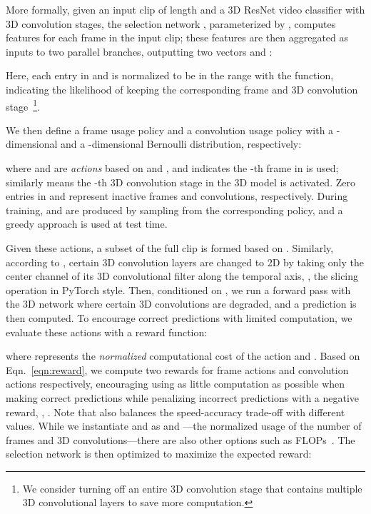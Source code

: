 \documentclass[final]{cvpr}
\begin{document}
More formally, given an input clip  of length  and a 3D ResNet video classifier  with  3D convolution stages, the selection network , parameterized by , computes features for each frame in the input clip; these features are then aggregated as inputs to two parallel branches, outputting two vectors  and :
 
Here, each entry in  and  is normalized to be in the range  with the  function, indicating the likelihood of keeping the corresponding frame and 3D convolution stage~\footnote{We consider turning off an entire 3D convolution stage that contains multiple 3D convolutional layers to save more computation.\label{footnote:3dstage}}. 



We then define a frame usage policy  and a convolution usage policy  with a -dimensional and a -dimensional Bernoulli distribution, respectively:

where   and   are \emph{actions} based on  and , and  indicates the -th frame in  is used; similarly  means the -th 3D convolution stage in the 3D model is activated. Zero entries in  and  represent inactive frames and convolutions, respectively. During training,  and  are produced by sampling from the corresponding policy, and a greedy approach is used at test time.

Given these actions, a subset  of the full clip  is formed based on . Similarly, according to , certain 3D convolution layers are changed to 2D by taking only the center channel of its 3D convolutional filter along the temporal axis, \ie, the slicing operation  in PyTorch style. Then, conditioned on , we run a forward pass with the 3D network where certain 3D convolutions are degraded, and a prediction is then computed. To encourage correct predictions with limited computation, we evaluate these actions with a reward function:

where  represents the \emph{normalized} computational cost of the action and . Based on Eqn.~\ref{eqn:reward}, we compute two rewards for frame actions and convolution actions respectively, encouraging using as little computation as possible when making correct predictions while penalizing incorrect predictions with a negative reward, \ie, . Note that  also balances the speed-accuracy trade-off with different values. While we instantiate  and  as  and ---the normalized usage of the number of frames and 3D convolutions---there are also other options such as FLOPs~\cite{arnet,amc}. The selection network is then optimized to maximize the expected reward:
\end{document}
